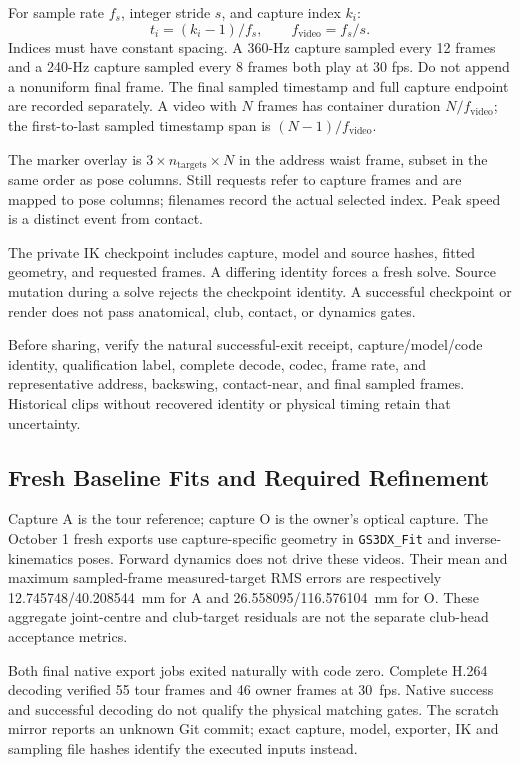 \documentclass[11pt,a4paper]{article}
\begin{document}
For sample rate $f_s$, integer stride $s$, and capture index $k_i$:
\[
  t_i=(k_i-1)/f_s,\qquad f_{\mathrm{video}}=f_s/s.
\]
Indices must have constant spacing. A 360-Hz capture sampled every 12 frames
and a 240-Hz capture sampled every 8 frames both play at 30 fps.
Do not append a nonuniform final frame. The final sampled timestamp and full
capture endpoint are recorded separately. A video with $N$ frames has container
duration $N/f_{\mathrm{video}}$; the first-to-last sampled timestamp span is
$(N-1)/f_{\mathrm{video}}$.

The marker overlay is $3\times n_{\mathrm{targets}}\times N$ in the address
waist frame, subset in the same order as pose columns. Still requests refer to
capture frames and are mapped to pose columns; filenames record the actual
selected index. Peak speed is a distinct event from contact.

The private IK checkpoint includes capture, model and source hashes, fitted
geometry, and requested frames. A differing identity forces a fresh solve.
Source mutation during a solve rejects the checkpoint identity. A successful
checkpoint or render does not pass anatomical, club, contact, or dynamics gates.

Before sharing, verify the natural successful-exit receipt, capture/model/code
identity, qualification label, complete decode, codec, frame rate, and
representative address, backswing, contact-near, and final sampled frames.
Historical clips without recovered identity or physical timing retain that
uncertainty.

\subsection{Fresh Baseline Fits and Required Refinement}
Capture A is the tour reference; capture O is the owner's optical capture.
The October 1 fresh exports use capture-specific geometry in
\texttt{GS3DX\_Fit} and inverse-kinematics poses. Forward dynamics does not
drive these videos. Their mean and maximum sampled-frame measured-target RMS
errors are respectively 12.745748/40.208544~mm for A and
26.558095/116.576104~mm for O. These aggregate joint-centre and club-target
residuals are not the separate club-head acceptance metrics.

Both final native export jobs exited naturally with code zero. Complete H.264
decoding verified 55 tour frames and 46 owner frames at 30~fps. Native success
and successful decoding do not qualify the physical matching gates. The
scratch mirror reports an unknown Git commit; exact capture, model, exporter,
IK and sampling file hashes identify the executed inputs instead.
\end{document}
